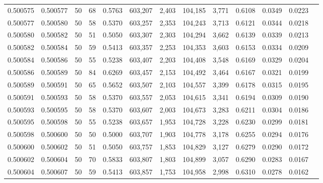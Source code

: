 \begin{tabular}{rrrrrrrrrrrrr}
0.500575 & 0.500577 &    50 &  68 &                                     0.5763 & 603,207 &   2,403 & 104,185 &   3,771 & 0.6108 & 0.0349 & 0.0223 \\
0.500577 & 0.500580 &    50 &  58 &                                     0.5370 & 603,257 &   2,353 & 104,243 &   3,713 & 0.6121 & 0.0344 & 0.0218 \\
0.500580 & 0.500582 &    50 &  51 &                                     0.5050 & 603,307 &   2,303 & 104,294 &   3,662 & 0.6139 & 0.0339 & 0.0213 \\
0.500582 & 0.500584 &    50 &  59 &                                     0.5413 & 603,357 &   2,253 & 104,353 &   3,603 & 0.6153 & 0.0334 & 0.0209 \\
0.500584 & 0.500586 &    50 &  55 &                                     0.5238 & 603,407 &   2,203 & 104,408 &   3,548 & 0.6169 & 0.0329 & 0.0204 \\
0.500586 & 0.500589 &    50 &  84 &                                     0.6269 & 603,457 &   2,153 & 104,492 &   3,464 & 0.6167 & 0.0321 & 0.0199 \\
0.500589 & 0.500591 &    50 &  65 &                                     0.5652 & 603,507 &   2,103 & 104,557 &   3,399 & 0.6178 & 0.0315 & 0.0195 \\
0.500591 & 0.500593 &    50 &  58 &                                     0.5370 & 603,557 &   2,053 & 104,615 &   3,341 & 0.6194 & 0.0309 & 0.0190 \\
0.500593 & 0.500595 &    50 &  58 &                                     0.5370 & 603,607 &   2,003 & 104,673 &   3,283 & 0.6211 & 0.0304 & 0.0186 \\
0.500595 & 0.500598 &    50 &  55 &                                     0.5238 & 603,657 &   1,953 & 104,728 &   3,228 & 0.6230 & 0.0299 & 0.0181 \\
0.500598 & 0.500600 &    50 &  50 &                                     0.5000 & 603,707 &   1,903 & 104,778 &   3,178 & 0.6255 & 0.0294 & 0.0176 \\
0.500600 & 0.500602 &    50 &  51 &                                     0.5050 & 603,757 &   1,853 & 104,829 &   3,127 & 0.6279 & 0.0290 & 0.0172 \\
0.500602 & 0.500604 &    50 &  70 &                                     0.5833 & 603,807 &   1,803 & 104,899 &   3,057 & 0.6290 & 0.0283 & 0.0167 \\
0.500604 & 0.500607 &    50 &  59 &                                     0.5413 & 603,857 &   1,753 & 104,958 &   2,998 & 0.6310 & 0.0278 & 0.0162 \\

\end{tabular}
